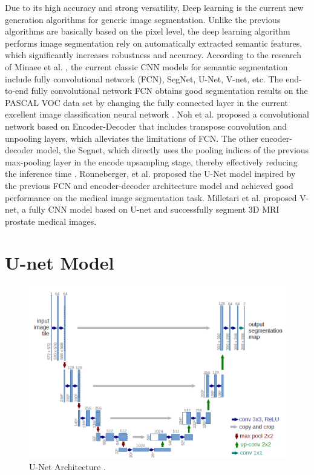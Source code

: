 \documentclass[12pt, a4paper]{article}
\begin{document}
	\par
	Due to its high accuracy and strong versatility, Deep learning is the current new generation algorithms for generic image segmentation. Unlike the previous algorithms are basically based on the pixel level, the deep learning algorithm performs image segmentation rely on automatically extracted semantic features, which significantly increases robustness and accuracy. According to the research of Minaee et al. \cite{minaee2020image}, the current classic CNN models for semantic segmentation include fully convolutional network (FCN), SegNet, U-Net, V-net, etc. The end-to-end fully convolutional network FCN obtains good segmentation results on the PASCAL VOC data set by changing the fully connected layer in the current excellent image classification neural network \cite{long2015fully}. Noh et al. \cite{noh2015learning} proposed a convolutional network based on Encoder-Decoder that includes transpose convolution and unpooling layers, which alleviates the limitations of FCN. The other encoder-decoder model, the Segnet, which directly uses the pooling indices of the previous max-pooling layer in the encode upsampling stage, thereby effectively reducing the inference time \cite{badrinarayanan2017segnet}. Ronneberger, et al. \cite{ronneberger2015u} proposed the U-Net model inspired by the previous FCN and encoder-decoder architecture model and achieved good performance on the medical image segmentation task. Milletari et al. \cite{milletari2016v} proposed V-net, a fully CNN model based on U-net and successfully segment 3D MRI prostate medical images. 

	\section{U-net Model} \justify
	\begin{figure}[h!] %
       \centering
	  \includegraphics[width=0.5\linewidth]{Capture.PNG}
	  \caption{U-Net Architecture \cite{ronneberger2015u}.}
	  \label{fig:Unet}
	\end{figure}
\end{document}

